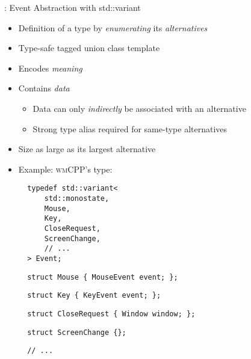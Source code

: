 \begin{frame}[c,fragile]{\underline{\cpp}: Event Abstraction with std::variant \hfill {\footnotesize \currentname}}


    \begin{itemize}

        \item Definition of a type by \textit{enumerating} its \textit{alternatives}

        \item Type-safe tagged union class template

        \item Encodes \textit{meaning}

        \item Contains \textit{data}
            \begin{itemize}
                \item Data can only \textit{indirectly} be associated with an alternative
                \item Strong type alias required for same-type alternatives
            \end{itemize}

        \item Size as large as its largest alternative

        \item Example: \textsc{wmCPP}'s  type:\\
\begin{minipage}[t]{.45\linewidth}
\begin{verbatim}
  typedef std::variant<
      std::monostate,
      Mouse,
      Key,
      CloseRequest,
      ScreenChange,
      // ...
  > Event;
\end{verbatim}
\end{minipage}%
\begin{minipage}[t]{.45\linewidth}
\begin{verbatim}
  struct Mouse { MouseEvent event; };
\end{verbatim}
\begin{verbatim}
  struct Key { KeyEvent event; };
\end{verbatim}
\begin{verbatim}
  struct CloseRequest { Window window; };
\end{verbatim}
\begin{verbatim}
  struct ScreenChange {};
\end{verbatim}
\begin{verbatim}
  // ...
\end{verbatim}
\end{minipage}

    \end{itemize}

    \vfill

\end{frame}

